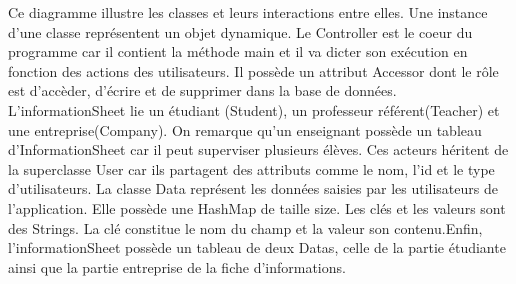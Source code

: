 \documentclass{scrreprt}
\begin{document}
Ce diagramme illustre les classes et leurs interactions entre elles. Une instance d'une classe représentent un objet dynamique. Le Controller est le coeur du programme car il contient la méthode main et il va dicter son exécution en fonction des actions des utilisateurs. Il possède un attribut Accessor dont le rôle est d'accèder, d'écrire et de supprimer dans la base de données. L'informationSheet lie un étudiant (Student), un professeur référent(Teacher) et une entreprise(Company). On remarque qu'un enseignant possède un tableau d'InformationSheet car il peut superviser plusieurs élèves. Ces acteurs héritent de la superclasse User car ils partagent des attributs comme le nom, l'id et le type d'utilisateurs. La classe Data représent les données saisies par les utilisateurs de l'application. Elle possède une HashMap de taille size. Les clés et les valeurs sont des Strings. La clé constitue le nom du champ et la valeur son contenu.Enfin, l'informationSheet possède un tableau de deux Datas, celle de la partie étudiante ainsi que la partie entreprise de la fiche d'informations.

\end{document}
